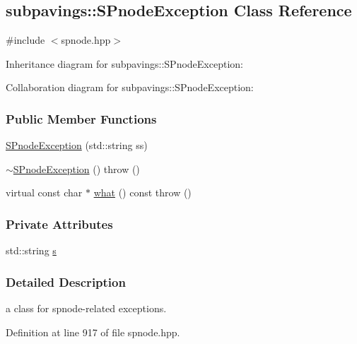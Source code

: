 \hypertarget{classsubpavings_1_1SPnodeException}{\subsection{subpavings\-:\-:\-S\-Pnode\-Exception \-Class \-Reference}
\label{classsubpavings_1_1SPnodeException}
}


{\ttfamily \#include $<$spnode.\-hpp$>$}



\-Inheritance diagram for subpavings\-:\-:\-S\-Pnode\-Exception\-:


\-Collaboration diagram for subpavings\-:\-:\-S\-Pnode\-Exception\-:
\subsubsection*{\-Public \-Member \-Functions}
\begin{DoxyCompactItemize}
\item 
\hyperlink{classsubpavings_1_1SPnodeException_ac288fa89893d06644668fbe38507c6f3}{\-S\-Pnode\-Exception} (std\-::string ss)
\item 
\hyperlink{classsubpavings_1_1SPnodeException_a5a8534c71a39a06ad55f90398d029959}{$\sim$\-S\-Pnode\-Exception} ()  throw ()
\item 
virtual const char $\ast$ \hyperlink{classsubpavings_1_1SPnodeException_a56f1039ade7b3e954b2f30fcfac4bf2e}{what} () const   throw ()
\end{DoxyCompactItemize}
\subsubsection*{\-Private \-Attributes}
\begin{DoxyCompactItemize}
\item 
std\-::string \hyperlink{classsubpavings_1_1SPnodeException_ad6356fcb207cb052e9c897f317a64547}{s}
\end{DoxyCompactItemize}


\subsubsection{\-Detailed \-Description}
a class for spnode-\/related exceptions. 

\-Definition at line 917 of file spnode.\-hpp.



